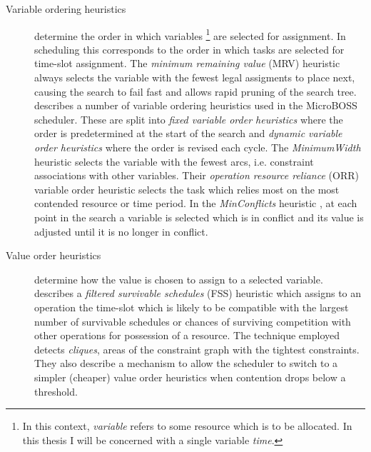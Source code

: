 \begin{description}
\item[Variable ordering heuristics]
determine the order in which variables \footnote{In this context, \emph{variable} refers to some resource which is to be allocated. In this thesis I will be concerned with a single variable \emph{time}.} are selected for assignment. In scheduling this corresponds to the order in which tasks are selected for time-slot assignment. The \emph{minimum remaining value} (MRV) heuristic \citep{bitner75backtrack} always selects the variable with the fewest legal assigments to place next, causing the search to fail fast and allows rapid pruning of the search tree. \citet{sadeh91lookahead} describes a number of variable ordering heuristics used in the MicroBOSS scheduler. These are split into \emph{fixed variable order heuristics} where the order is predetermined at the start of the search and \emph{dynamic variable order heuristics} where the order is revised each cycle. The \emph{MinimumWidth} heuristic selects the variable with the fewest arcs, i.e. constraint associations with other variables. Their \emph{operation resource reliance} (ORR) variable order heuristic selects the task which relies most on the most contended resource or time period. In the \emph{MinConflicts} heuristic \citep{minton92minconflicts}, at each point in the search a variable is selected which is in conflict and its value is adjusted until it is no longer in conflict. 


\item[Value order heuristics]
determine how the value is chosen to assign to a selected variable. \citet{sadeh91lookahead} describes a \emph{filtered survivable schedules} (FSS) heuristic which assigns to an operation the time-slot which is likely to be compatible with the largest number of survivable schedules or chances of surviving competition with other operations for possession of a resource. The technique employed detects \emph{cliques}, areas of the constraint graph with the tightest constraints. They also describe a mechanism to allow the scheduler to switch to a simpler (cheaper) value order heuristics when contention drops below a threshold.



\end{description}
